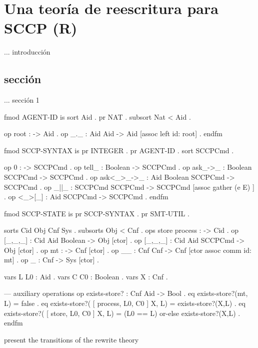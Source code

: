 \chapter{Una teor\'ia de reescritura para SCCP (R)}
\label{cap4.sccp}

... introducci\'on

\section{secci\'on}
\label{s1.formal}

... secci\'on 1


\begin{maude}
fmod AGENT-ID is
  sort Aid .
  pr NAT .
  subsort Nat < Aid .

  op root : -> Aid .
  op _._ : Aid Aid -> Aid [assoc left id: root] .
endfm
\end{maude}

\begin{maude}
fmod SCCP-SYNTAX is
  pr INTEGER .
  pr AGENT-ID .
  sort SCCPCmd .

  op 0 : -> SCCPCmd . 
  op tell_ : Boolean -> SCCPCmd . 
  op ask_->_ : Boolean SCCPCmd -> SCCPCmd .
  op ask<_>_->_ : Aid Boolean SCCPCmd -> SCCPCmd .
  op _||_ : SCCPCmd SCCPCmd -> SCCPCmd [assoc gather (e E) ] .
  op <_>[_] : Aid SCCPCmd -> SCCPCmd .
endfm
\end{maude}

\begin{maude}
fmod SCCP-STATE is
  pr SCCP-SYNTAX .
  pr SMT-UTIL .

  sorts Cid Obj Cnf Sys .
  subsorts Obj < Cnf .
  ops store process : -> Cid .
  op [_,_,_] : Cid Aid Boolean -> Obj [ctor] .
  op [_,_,_] : Cid Aid SCCPCmd -> Obj [ctor] .
  op mt : -> Cnf [ctor] .
  op __ : Cnf Cnf -> Cnf [ctor assoc comm id: mt] .
  op {_} : Cnf -> Sys [ctor] .

  vars L L0    : Aid .
  vars C C0    : Boolean .
  vars X       : Cnf .

  --- auxiliary operations
  op exists-store? : Cnf Aid -> Bool .
  eq exists-store?(mt, L)
   = false .
  eq exists-store?( [ process, L0, C0 ] X, L)
   = exists-store?(X,L) .
  eq exists-store?( [ store, L0, C0 ] X, L)
   = (L0 == L) or-else exists-store?(X,L) .
endfm
\end{maude}

present the transitions of the rewrite theory

